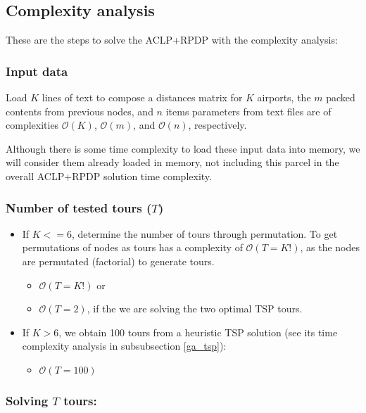 \documentclass[preprint,authoryear]{elsarticle}
\begin{document}
{\color{blue}
\subsection{Complexity analysis}


These are the steps to solve the ACLP+RPDP with the complexity analysis:

\subsubsection{Input data}

Load $K$ lines of text to compose a distances matrix for $K$ airports, the $m$ packed contents from previous nodes, and $n$ items parameters from text files are of complexities $\mathcal{O}(K)$, $\mathcal{O}(m)$, and $\mathcal{O}(n)$, respectively.

Although there is some time complexity to load these input data into memory, we will consider them already loaded in memory, not including this parcel in the overall ACLP+RPDP solution time complexity.

\subsubsection{Number of tested tours ($T$)}

\begin{itemize}
\item If $K <= 6$, determine the number of tours through permutation. To get permutations of nodes as tours has a complexity of $\mathcal{O}(T = K!)$, as the nodes are permutated (factorial) to generate tours.

	\begin{itemize}
	\item $ \mathcal{O}(T = K!)$ or
	\item $ \mathcal{O}(T = 2)$, if the we are solving the two optimal TSP tours.
	\end{itemize}

\item If $K > 6$, we obtain 100 tours from a heuristic TSP solution (see its time complexity analysis in subsubsection \ref{ga_tsp}):

	\begin{itemize}
		\item $\mathcal{O}(T = 100)$
	\end{itemize}
\end{itemize}

\subsubsection{Solving $T$ tours:}

}
\end{document}
